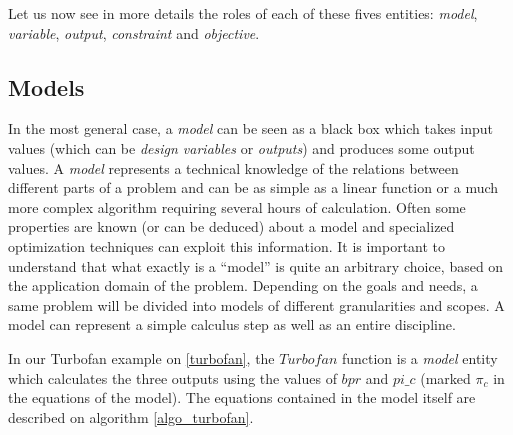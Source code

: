 Let us now see in more details the roles of each of these fives entities: \emph{model}, \emph{variable}, \emph{output}, \emph{constraint} and \emph{objective}.

\subsection{Models}

In the most general case, a \emph{model} can be seen as a black box which takes input values (which can be \emph{design variables} or \emph{outputs}) and produces some output values. A \emph{model} represents a technical knowledge of the relations between different parts of a problem and can be as simple as a linear function or a much more complex algorithm requiring several hours of calculation. Often some properties are known (or can be deduced) about a model and specialized optimization techniques can exploit this information. It is important to understand that what exactly is a \enquote{model} is quite an arbitrary choice, based on the application domain of the problem. Depending on the goals and needs, a same problem will be divided into models of different granularities and scopes. A model can represent a simple calculus step as well as an entire discipline.

In our Turbofan example on \figurename{} \ref{turbofan}, the $Turbofan$ function is a \emph{model} entity which calculates the three outputs using the values of $bpr$ and $pi\_c$ (marked $\pi_c$ in the equations of the model). The equations contained in the model itself are described on algorithm \ref{algo_turbofan}.

